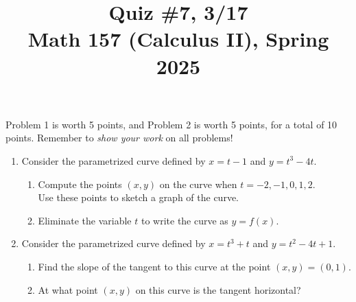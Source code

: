 \documentclass[11pt]{article}
\title{Quiz \#7, 3/17\\ Math 157 (Calculus II), Spring 2025}
\date{}
\begin{document}
\maketitle

\thispagestyle{empty}

\vspace{-2cm}

Problem 1 is worth 5 points, and Problem 2 is worth 5 points, for a total of 10 points. Remember to \emph{show your work} on all problems!

\begin{enumerate}
\item Consider the parametrized curve defined by $x = t-1$ and $y=t^3-4t$.
\begin{enumerate}
\item Compute the points $(x,y)$ on the curve when $t=-2, -1, 0, 1, 2$. \\ Use these points to sketch a graph of the curve.
\item Eliminate the variable $t$ to write the curve as $y=f(x)$.
\end{enumerate}

\vspace{3.15in}

\item Consider the parametrized curve defined by $x = t^3+t$ and $y=t^2-4t+1$.
\begin{enumerate}
\item Find the slope of the tangent to this curve at the point $(x,y) = (0,1)$.
\item At what point $(x,y)$ on this curve is the tangent horizontal?
\end{enumerate}

\end{enumerate}
\end{document}
